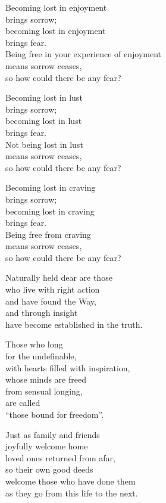 Becoming lost in enjoyment\\
brings sorrow;\\
becoming lost in enjoyment\\
brings fear.\\
Being free in your experience of enjoyment\\
means sorrow ceases,\\
so how could there be any fear?


Becoming lost in lust\\
brings sorrow;\\
becoming lost in lust\\
brings fear.\\
Not being lost in lust\\
means sorrow ceases,\\
so how could there be any fear?



Becoming lost in craving\\
brings sorrow;\\
becoming lost in craving\\
brings fear.\\
Being free from craving\\
means sorrow ceases,\\
so how could there be any fear?


Naturally held dear are those\\
who live with right action\\
and have found the Way,\\
and through insight\\
have become established in the truth.


Those who long\\
for the undefinable,\\
with hearts filled with inspiration,\\
whose minds are freed\\
from sensual longing,\\
are called\\
“those bound for freedom”.


Just as family and friends\\
joyfully welcome home\\
loved ones returned from afar,\\
so their own good deeds\\
welcome those who have done them\\
as they go from this life to the next.


